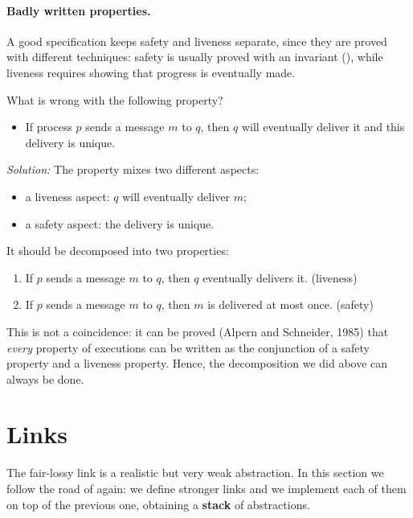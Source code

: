 \paragraph{Badly written properties.} A good specification keeps safety and liveness separate, since they are proved with different techniques: safety is usually proved with an invariant (), while liveness requires showing that progress is eventually made.

\begin{framedprob}{}
  What is wrong with the following property?
  \begin{itemize}
    \item[] If process $p$ sends a message $m$ to $q$, then $q$ will eventually deliver it and this delivery is unique.
  \end{itemize}
\end{framedprob}

\textit{Solution:} The property mixes two different aspects:
\begin{itemize}
  \item a liveness aspect: $q$ will eventually deliver $m$;
  \item a safety aspect: the delivery is unique.
\end{itemize}
It should be decomposed into two properties:
\begin{enumerate}
  \item If $p$ sends a message $m$ to $q$, then $q$ eventually delivers it. \hfill (liveness)
  \item If $p$ sends a message $m$ to $q$, then $m$ is delivered at most once. \hfill (safety)
\end{enumerate}

\begin{framedobs}{}
  This is not a coincidence: it can be proved (Alpern and Schneider, 1985) that \textit{every} property of executions can be written as the conjunction of a safety property and a liveness property. Hence, the decomposition we did above can always be done.
\end{framedobs}

\section{Links}

The fair-lossy link is a realistic but very weak abstraction. In this section we follow the road of  again: we define stronger links and we implement each of them on top of the previous one, obtaining a \textbf{stack} of abstractions.

